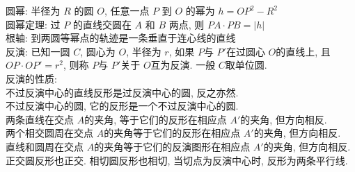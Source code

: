 \noindent
圆幂: 半径为 $R$ 的圆 $O$, 任意一点 $P$ 到 $O$ 的幂为 $h=OP^2-R^2$\\
圆幂定理: 过 $P$ 的直线交圆在 $A$ 和 $B$ 两点, 则 $PA\cdot PB=|h|$\\
根轴: 到两圆等幂点的轨迹是一条垂直于连心线的直线\\
反演: 已知一圆 $C$, 圆心为 $O$, 半径为 $r$, 如果 $P$与 $P'$在过圆心 $O$的直线上, 且 $OP\cdot OP'=r^2$, 则称 $P$与 $P'$关于 $O$互为反演. 一般 $C$取单位圆.\\
反演的性质: \\
不过反演中心的直线反形是过反演中心的圆, 反之亦然.\\
不过反演中心的圆, 它的反形是一个不过反演中心的圆.\\
两条直线在交点 $A$的夹角, 等于它们的反形在相应点 $A'$的夹角, 但方向相反.\\
两个相交圆周在交点 $A$的夹角等于它们的反形在相应点 $A'$的夹角, 但方向相反.\\
直线和圆周在交点 $A$的夹角等于它们的反演图形在相应点 $A'$的夹角, 但方向相反.\\
正交圆反形也正交. 相切圆反形也相切, 当切点为反演中心时, 反形为两条平行线.